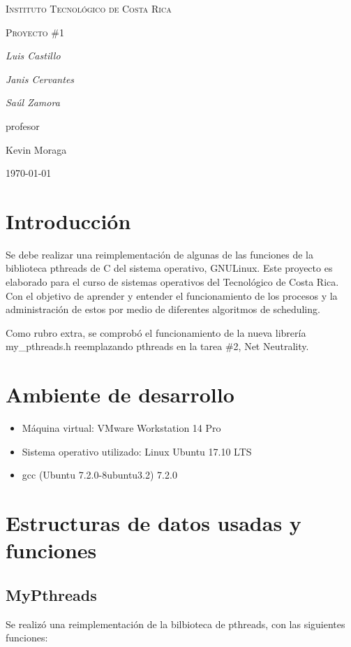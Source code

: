\documentclass{article}
\begin{document}
\begin{titlepage}
  \centering
  {\scshape\LARGE Instituto Tecnol\'ogico de Costa Rica \par}
  \vspace{1cm}
  {\scshape\Large Proyecto \#1\par}
  \vspace{1.5cm}
  {\Large\itshape Luis Castillo\par}
  {\Large\itshape Janis Cervantes\par}
  {\Large\itshape Sa\'ul Zamora\par}
  \vfill
  profesor\par
  Kevin Moraga \textsc{}

  \vfill

  {\large \today\par}
\end{titlepage}

\section{Introducci\'on}
Se debe realizar una re\-implementaci\'on de algunas de las funciones de la biblioteca pthreads de C del sistema operativo, GNU\/Linux. Este proyecto es elaborado para el curso de sistemas operativos del Tecnológico de Costa Rica. Con el objetivo de aprender y entender el funcionamiento de los procesos y la administración de estos por medio de diferentes algoritmos de scheduling. 

Como rubro extra, se comprob\'o el funcionamiento de la nueva librer\'ia my\_pthreads.h reemplazando pthreads en la tarea \#2, Net Neutrality.

\section{Ambiente de desarrollo}
\begin{itemize}
  \item M\'aquina virtual: VMware Workstation 14 Pro
  \item Sistema operativo utilizado: Linux Ubuntu 17.10 LTS
  \item gcc (Ubuntu 7.2.0-8ubuntu3.2) 7.2.0
\end{itemize}

\section{Estructuras de datos usadas y funciones}
\subsection{MyPthreads}
Se realiz\'o una reimplementaci\'on de la bilbioteca de pthreads, con las siguientes funciones:
\end{document}

